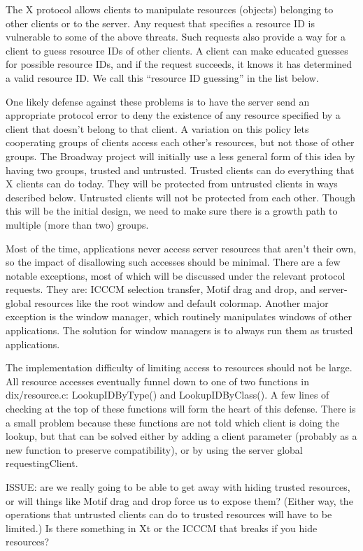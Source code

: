 The X protocol allows clients to manipulate resources (objects)
belonging to other clients or to the server.  Any request that
specifies a resource ID is vulnerable to some of the above threats.
Such requests also provide a way for a client to guess resource IDs of
other clients.  A client can make educated guesses for possible
resource IDs, and if the request succeeds, it knows it has determined
a valid resource ID.  We call this ``resource ID guessing'' in the
list below.

One likely defense against these problems is to have the server send
an appropriate protocol error to deny the existence of any resource
specified by a client that doesn't belong to that client.  A variation
on this policy lets cooperating groups of clients access each other's
resources, but not those of other groups.  The Broadway project will
initially use a less general form of this idea by having two groups,
trusted and untrusted.  Trusted clients can do everything that X
clients can do today.  They will be protected from untrusted clients
in ways described below.  Untrusted clients will not be protected from
each other.  Though this will be the initial design, we need to make
sure there is a growth path to multiple (more than two) groups.

Most of the time, applications never access server resources that
aren't their own, so the impact of disallowing such accesses should be
minimal.  There are a few notable exceptions, most of which will be
discussed under the relevant protocol requests.  They are: ICCCM
selection transfer, Motif drag and drop, and server-global resources
like the root window and default colormap.  Another major exception is
the window manager, which routinely manipulates windows of other
applications.  The solution for window managers is to always run them
as trusted applications.

The implementation difficulty of limiting access to resources should
not be large.  All resource accesses eventually funnel down to one of
two functions in dix/resource.c: LookupIDByType() and
LookupIDByClass().  A few lines of checking at the top of these
functions will form the heart of this defense.  There is a small
problem because these functions are not told which client is doing the
lookup, but that can be solved either by adding a client parameter
(probably as a new function to preserve compatibility), or by using
the server global requestingClient.

ISSUE: are we really going to be able to get away with hiding trusted
resources, or will things like Motif drag and drop force us to expose
them?  (Either way, the operations that untrusted clients can do to
trusted resources will have to be limited.)  Is there something in Xt
or the ICCCM that breaks if you hide resources?

